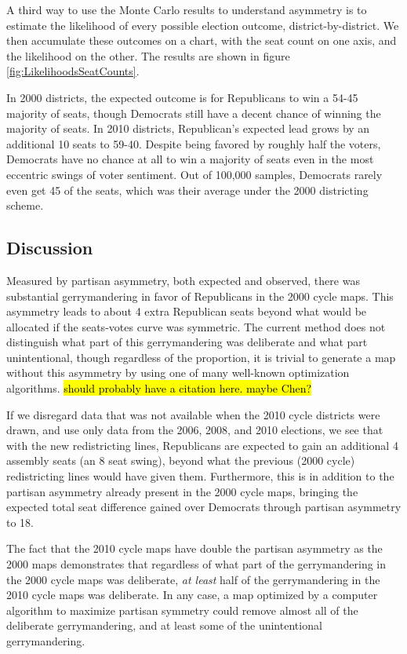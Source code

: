 \documentclass[preprint,12pt]{article}
\newcommand{\KB}[2][cyan]{ {\sethlcolor{#1} \hl{#2}} }
\begin{document}
A third way to use the Monte Carlo results to understand asymmetry is to estimate the likelihood of every possible election outcome, district-by-district.
We then accumulate these outcomes on a chart, with the seat count on one axis, and the likelihood on the other.  The results are shown in figure \ref{fig:LikelihoodsSeatCounts}.

In 2000 districts, the expected outcome is for Republicans to win a 54-45 majority of seats, though Democrats still have a decent chance of winning the majority of seats. 
In 2010 districts, Republican's expected lead grows by an additional 10 seats to 59-40. 
Despite being favored by roughly half the voters, Democrats have no chance at all to win a majority of seats even in the most eccentric swings of voter sentiment.
Out of 100,000 samples, Democrats rarely even get 45 of the seats, which was their average under the 2000 districting scheme.

\subsection{Discussion}

Measured by partisan asymmetry, both expected and observed, there was substantial gerrymandering in favor of Republicans in the 2000 cycle maps.
This asymmetry leads to about 4 extra Republican seats beyond what would be allocated if the seats-votes curve was symmetric.
The current method does not distinguish what part of this gerrymandering was deliberate and what part unintentional, though regardless of the proportion, it is trivial to generate a map without this asymmetry by using one of many well-known optimization algorithms. \KB{should probably have a citation here.  maybe Chen?}

If we disregard data that was not available when the 2010 cycle districts were drawn, and use only data from the 2006, 2008, and 2010 elections, we see that with the new redistricting lines, Republicans are expected to gain an additional 4 assembly seats (an 8 seat swing), beyond what the previous (2000 cycle) redistricting lines would have given them.
Furthermore, this is in addition to the partisan asymmetry already present in the 2000 cycle maps, bringing the expected total seat difference gained over Democrats through partisan asymmetry to 18.

The fact that the 2010 cycle maps have double the partisan asymmetry as the 2000 maps demonstrates that regardless of what part of the gerrymandering in the 2000 cycle maps was deliberate, \emph{at least} half of the gerrymandering in the 2010 cycle maps was deliberate.
In any case, a map optimized by a computer algorithm to maximize partisan symmetry could remove almost all of the deliberate gerrymandering, and at least some of the unintentional gerrymandering.
\end{document}
